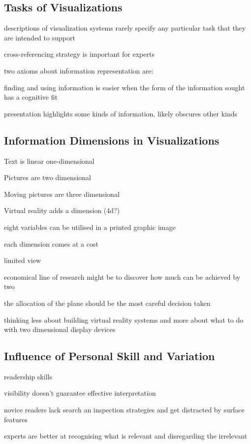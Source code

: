 \documentclass[11pt, a4paper, ngerman, twoside]{article}
\theoremstyle{plain}\newtheorem{Lemma}{Lemma}
\theoremstyle{plain}\newtheorem{Satz}[Lemma]{Satz}
\theoremstyle{definition}\newtheorem{Definition}[Lemma]{Definition}
\theoremstyle{definition}\newtheorem*{Beispiel}{Beispiel}
\theoremstyle{remark}\newtheorem*{Bemerkung}{Bemerkung}
\begin{document}
\subsection{Tasks of Visualizations}

descriptions of visualization systems rarely specify any particular task that they are intended to support

cross-referencing strategy is important for experts

two axioms about information representation are:

finding and using information is easier when the form of the information sought has a cognitive fit

presentation highlights some kinds of information, likely obscures other kinds

\subsection{Information Dimensions in Visualizations}

Text is linear one-dimensional

Pictures are two dimensional

Moving pictures are three dimensional

Virtual reality adds a dimension (4d?)

eight variables can be utilised in a printed graphic image

each dimension comes at a cost

limited view 

economical line of research might be to discover how much can be achieved by two

the allocation of the plane should be the most careful decision taken

thinking less about building virtual reality systems and more about what to do with two dimensional display devices

\subsection{Influence of Personal Skill and Variation}

readership skills

visibility doesn’t guarantee effective interpretation

novice readers lack search an inspection strategies and get distracted by surface features

experts are better at recognising what is relevant and disregarding the irrelevant
\end{document}

